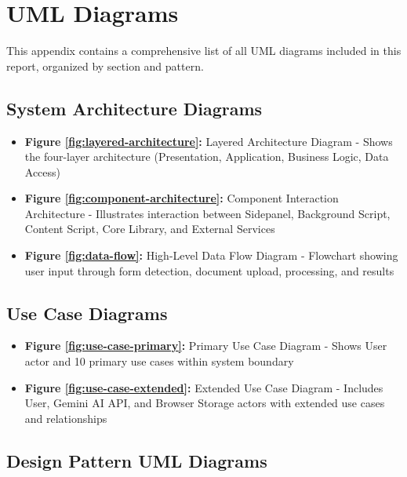 \documentclass[11pt, a4paper]{article}
\theoremstyle{plain}
\theoremstyle{definition}
\begin{document}
\newpage
\appendix

\section{UML Diagrams}

This appendix contains a comprehensive list of all UML diagrams included in this report, organized by section and pattern.

\subsection{System Architecture Diagrams}

\begin{itemize}
    \item \textbf{Figure \ref{fig:layered-architecture}:} Layered Architecture Diagram - Shows the four-layer architecture (Presentation, Application, Business Logic, Data Access)
    
    \item \textbf{Figure \ref{fig:component-architecture}:} Component Interaction Architecture - Illustrates interaction between Sidepanel, Background Script, Content Script, Core Library, and External Services
    
    \item \textbf{Figure \ref{fig:data-flow}:} High-Level Data Flow Diagram - Flowchart showing user input through form detection, document upload, processing, and results
\end{itemize}

\subsection{Use Case Diagrams}

\begin{itemize}
    \item \textbf{Figure \ref{fig:use-case-primary}:} Primary Use Case Diagram - Shows User actor and 10 primary use cases within system boundary
    
    \item \textbf{Figure \ref{fig:use-case-extended}:} Extended Use Case Diagram - Includes User, Gemini AI API, and Browser Storage actors with extended use cases and relationships
\end{itemize}

\subsection{Design Pattern UML Diagrams}
\end{document}
